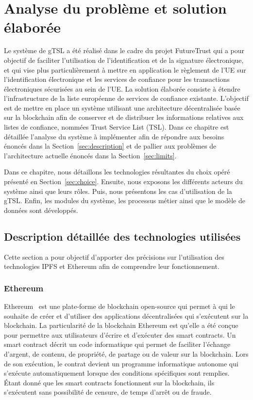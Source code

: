 \documentclass{tnreport}
\begin{document}
\chapter{Analyse du problème et solution élaborée}
\label{chap:analyse}

Le système de gTSL a été réalisé dans le cadre du projet FutureTrust qui a pour objectif de faciliter l'utilisation de l'identification et de la signature électronique, et qui vise plus particulièrement à mettre en application le règlement de l'UE sur l'identification électronique et les services de confiance pour les transactions électroniques sécurisées au sein de l'UE.
La solution élaborée consiste à étendre l'infrastructure de la liste européenne de services de confiance existante. L'objectif est de mettre en place un système utilisant une architecture décentralisée basée sur la blockchain afin de conserver et de distribuer les informations relatives aux listes de confiance, nommées Trust Service List (TSL). Dans ce chapitre est détaillée l'analyse du système à implémenter afin de répondre aux besoins énoncés dans la Section~\ref{sec:description} et de pallier aux problèmes de l'architecture actuelle énoncés dans la Section~\ref{sec:limits}. 

Dans ce chapitre, nous détaillons les technologies résultantes du choix opéré présenté en Section~\ref{sec:choice}. Ensuite, nous exposons les différents acteurs du système ainsi que leurs rôles. Puis, nous présentons les cas d'utilisation de la gTSL. Enfin, les modules du système, les processus métier ainsi que le modèle de données sont développés.

\section{Description détaillée des technologies utilisées}

Cette section a pour objectif d'apporter des précisions sur l'utilisation des technologies IPFS et Ethereum afin de comprendre leur fonctionnement.

\subsection{Ethereum}

Ethereum~\cite{eth} est une plate-forme de blockchain open-source qui permet à qui le souhaite de créer et d'utiliser des applications décentralisées qui s'exécutent sur la blockchain. 
La particularité de la blockchain Ethereum est qu'elle a été conçue pour permettre aux utilisateurs d'écrire et d'exécuter des smart contracts. Un smart contract décrit un code informatique qui permet de faciliter l'échange d'argent, de contenu, de propriété, de partage ou de valeur sur la blockchain.
Lors de son exécution, le contrat devient un programme informatique autonome qui s'exécute automatiquement lorsque des conditions spécifiques sont remplies. Étant donné que les smart contracts fonctionnent sur la blockchain, ils s'exécutent sans possibilité de censure, de temps d'arrêt ou de fraude. 
\end{document}
